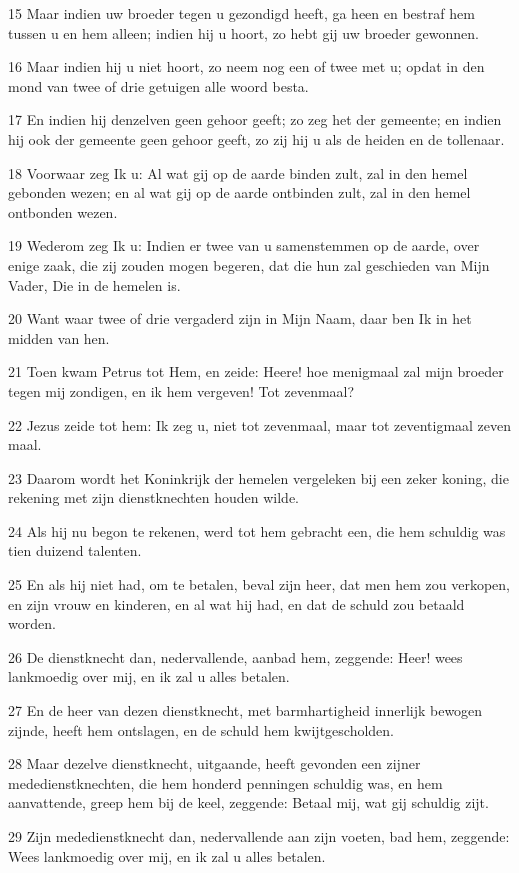 \par 15 Maar indien uw broeder tegen u gezondigd heeft, ga heen en bestraf hem tussen u en hem alleen; indien hij u hoort, zo hebt gij uw broeder gewonnen.
\par 16 Maar indien hij u niet hoort, zo neem nog een of twee met u; opdat in den mond van twee of drie getuigen alle woord besta.
\par 17 En indien hij denzelven geen gehoor geeft; zo zeg het der gemeente; en indien hij ook der gemeente geen gehoor geeft, zo zij hij u als de heiden en de tollenaar.
\par 18 Voorwaar zeg Ik u: Al wat gij op de aarde binden zult, zal in den hemel gebonden wezen; en al wat gij op de aarde ontbinden zult, zal in den hemel ontbonden wezen.
\par 19 Wederom zeg Ik u: Indien er twee van u samenstemmen op de aarde, over enige zaak, die zij zouden mogen begeren, dat die hun zal geschieden van Mijn Vader, Die in de hemelen is.
\par 20 Want waar twee of drie vergaderd zijn in Mijn Naam, daar ben Ik in het midden van hen.
\par 21 Toen kwam Petrus tot Hem, en zeide: Heere! hoe menigmaal zal mijn broeder tegen mij zondigen, en ik hem vergeven! Tot zevenmaal?
\par 22 Jezus zeide tot hem: Ik zeg u, niet tot zevenmaal, maar tot zeventigmaal zeven maal.
\par 23 Daarom wordt het Koninkrijk der hemelen vergeleken bij een zeker koning, die rekening met zijn dienstknechten houden wilde.
\par 24 Als hij nu begon te rekenen, werd tot hem gebracht een, die hem schuldig was tien duizend talenten.
\par 25 En als hij niet had, om te betalen, beval zijn heer, dat men hem zou verkopen, en zijn vrouw en kinderen, en al wat hij had, en dat de schuld zou betaald worden.
\par 26 De dienstknecht dan, nedervallende, aanbad hem, zeggende: Heer! wees lankmoedig over mij, en ik zal u alles betalen.
\par 27 En de heer van dezen dienstknecht, met barmhartigheid innerlijk bewogen zijnde, heeft hem ontslagen, en de schuld hem kwijtgescholden.
\par 28 Maar dezelve dienstknecht, uitgaande, heeft gevonden een zijner mededienstknechten, die hem honderd penningen schuldig was, en hem aanvattende, greep hem bij de keel, zeggende: Betaal mij, wat gij schuldig zijt.
\par 29 Zijn mededienstknecht dan, nedervallende aan zijn voeten, bad hem, zeggende: Wees lankmoedig over mij, en ik zal u alles betalen.
